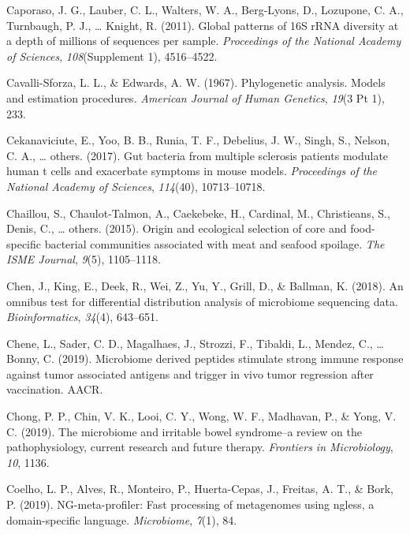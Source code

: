 \documentclass[12pt,a4paper]{reedthesis}
\theoremstyle{definition}
\theoremstyle{definition}
\theoremstyle{definition}
\theoremstyle{remark}
\begin{document}
\leavevmode\hypertarget{ref-caporaso2011global}{}%
Caporaso, J. G., Lauber, C. L., Walters, W. A., Berg-Lyons, D., Lozupone, C. A., Turnbaugh, P. J., \ldots{} Knight, R. (2011). Global patterns of 16S rRNA diversity at a depth of millions of sequences per sample. \emph{Proceedings of the National Academy of Sciences}, \emph{108}(Supplement 1), 4516--4522.

\leavevmode\hypertarget{ref-cavalli1967phylogenetic}{}%
Cavalli-Sforza, L. L., \& Edwards, A. W. (1967). Phylogenetic analysis. Models and estimation procedures. \emph{American Journal of Human Genetics}, \emph{19}(3 Pt 1), 233.

\leavevmode\hypertarget{ref-cekanaviciute2017gut}{}%
Cekanaviciute, E., Yoo, B. B., Runia, T. F., Debelius, J. W., Singh, S., Nelson, C. A., \ldots{} others. (2017). Gut bacteria from multiple sclerosis patients modulate human t cells and exacerbate symptoms in mouse models. \emph{Proceedings of the National Academy of Sciences}, \emph{114}(40), 10713--10718.

\leavevmode\hypertarget{ref-chaillou2015origin}{}%
Chaillou, S., Chaulot-Talmon, A., Caekebeke, H., Cardinal, M., Christieans, S., Denis, C., \ldots{} others. (2015). Origin and ecological selection of core and food-specific bacterial communities associated with meat and seafood spoilage. \emph{The ISME Journal}, \emph{9}(5), 1105--1118.

\leavevmode\hypertarget{ref-chen2018omnibus}{}%
Chen, J., King, E., Deek, R., Wei, Z., Yu, Y., Grill, D., \& Ballman, K. (2018). An omnibus test for differential distribution analysis of microbiome sequencing data. \emph{Bioinformatics}, \emph{34}(4), 643--651.

\leavevmode\hypertarget{ref-chene2019microbiome}{}%
Chene, L., Sader, C. D., Magalhaes, J., Strozzi, F., Tibaldi, L., Mendez, C., \ldots{} Bonny, C. (2019). Microbiome derived peptides stimulate strong immune response against tumor associated antigens and trigger in vivo tumor regression after vaccination. AACR.

\leavevmode\hypertarget{ref-chong2019microbiome}{}%
Chong, P. P., Chin, V. K., Looi, C. Y., Wong, W. F., Madhavan, P., \& Yong, V. C. (2019). The microbiome and irritable bowel syndrome--a review on the pathophysiology, current research and future therapy. \emph{Frontiers in Microbiology}, \emph{10}, 1136.

\leavevmode\hypertarget{ref-coelho2019ng}{}%
Coelho, L. P., Alves, R., Monteiro, P., Huerta-Cepas, J., Freitas, A. T., \& Bork, P. (2019). NG-meta-profiler: Fast processing of metagenomes using ngless, a domain-specific language. \emph{Microbiome}, \emph{7}(1), 84.
\end{document}
